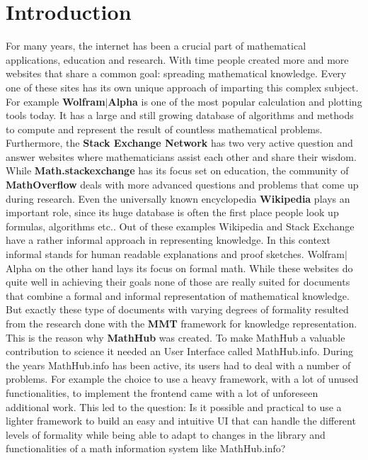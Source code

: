 \documentclass[11pt,a4paper]{article}
\begin{document}
\section{Introduction}
For many years, the internet has been a crucial part of mathematical applications, education and research. 
With time people created more and more websites that share a common goal: spreading mathematical knowledge.
Every one of these sites has its own unique approach of imparting this complex subject.
For example \textbf{Wolfram$|$Alpha} \cite{wolfram} is one of the most popular calculation and plotting tools today.
It has a large and still growing database of algorithms and methods to compute and represent the result of countless mathematical problems.
Furthermore, the \textbf{Stack Exchange Network} has two very active question and answer websites where mathematicians assist each other and share their wisdom.
While \textbf{Math.stackexchange} has its focus set on education, the community of \textbf{MathOverflow} deals with more advanced questions and problems that come up during research.
Even the universally known encyclopedia \textbf{Wikipedia} plays an important role, since its huge database is often the first place people look up formulas, algorithms etc..
\newline \newline
Out of these examples Wikipedia and Stack Exchange have a rather informal approach in representing knowledge.
In this context informal stands for human readable explanations and proof sketches.
Wolfram$|$Alpha on the other hand lays its focus on formal math.
While these websites do quite well in achieving their goals none of those are really suited for documents that combine a formal and informal representation of mathematical knowledge.
But exactly these type of documents with varying degrees of formality resulted from the research done with the \textbf{MMT} framework for knowledge representation.
This is the reason why \textbf{MathHub} \cite{MathHub} was created.
To make MathHub a valuable contribution to science it needed an User Interface called MathHub.info.
During the years MathHub.info has been active, its users had to deal with a number of problems.
For example the choice to use a heavy framework, with a lot of unused functionalities, to implement the frontend came with a lot of unforeseen additional work.
This led to the question: Is it possible and practical to use a lighter framework to build an easy and intuitive UI that can handle the different levels of formality while being able to adapt to changes in the library and functionalities of a math information system like MathHub.info?
\end{document}
